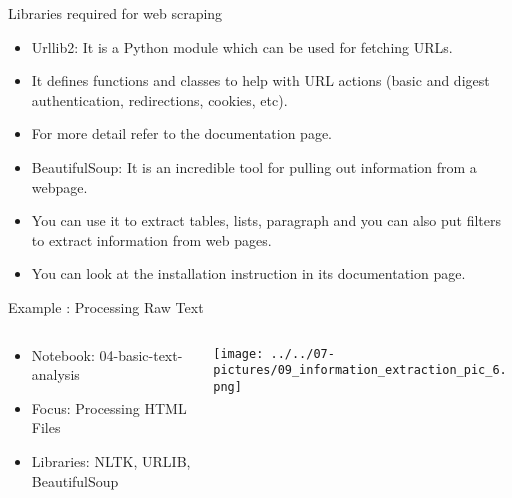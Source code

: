 \documentclass[11pt]{beamer}
\begin{document}
\begin{frame}{Libraries required for web scraping}
	\begin{itemize}
		\item Urllib2: It is a Python module which can be used for fetching URLs. 
		\item It defines functions and classes to help with URL actions (basic and digest authentication, redirections, cookies, etc). 
		\item For more detail refer to the documentation page.
		\item BeautifulSoup: It is an incredible tool for pulling out information from a webpage. 
		\item You can use it to extract tables, lists, paragraph and you can also put filters to extract information from web pages. 
		\item You can look at the installation instruction in its documentation page.
	\end{itemize}
\end{frame}
\begin{frame}{Example : Processing Raw Text}
\begin{columns}[T] %
\begin{column}{.48\textwidth}
        \begin{itemize}
		\item Notebook: 04-basic-text-analysis
		\item Focus: Processing HTML Files
		\item Libraries: NLTK, URLIB, BeautifulSoup
        \end{itemize}
\end{column}%
\hfill%
\begin{column}{.48\textwidth}
        \texttt{[image: ../../07-pictures/09\_information\_extraction\_pic\_6.png]}
\end{column}%
\end{columns}
\end{frame}
\end{document}
